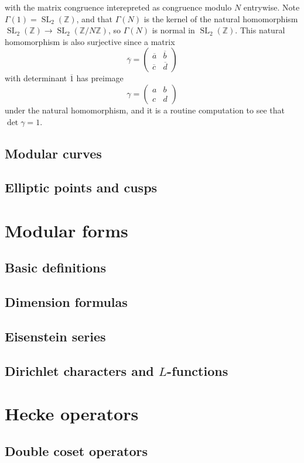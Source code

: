 \documentclass[11pt,leqno]{article}
\DeclareMathOperator{\SL}{SL}
\begin{document}
with the matrix congruence interepreted as congruence modulo $N$ entrywise. Note $\Gamma(1) = \SL_2(\mathbb{Z})$, and that $\Gamma(N)$ is the kernel of the natural homomorphism $\SL_2(\mathbb{Z})\to \SL_2(\mathbb{Z}/N\mathbb{Z})$, so $\Gamma(N)$ is normal in $\SL_2(\mathbb{Z})$. This natural homomorphism is also surjective since a matrix \[\overline \gamma = \begin{pmatrix}
    \overline a & \overline b \\ \overline c & \overline d
\end{pmatrix}\] with determinant $\overline 1$ has preimage \[\gamma = \begin{pmatrix}
    a & b \\ c & d
\end{pmatrix}\] under the natural homomorphism, and it is a routine computation to see that $\det\gamma =1$.
\subsection{Modular curves}
\subsection{Elliptic points and cusps}

\newpage\section{Modular forms}
\subsection{Basic definitions}
\subsection{Dimension formulas}
\subsection{Eisenstein series}
\subsection{Dirichlet characters and $L$-functions}

\newpage\section{Hecke operators}
\subsection{Double coset operators}
\end{document}
